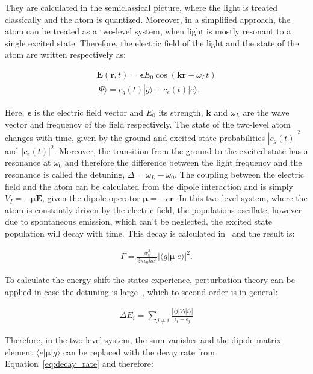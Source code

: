 They are calculated in the semiclassical picture, where the light is treated classically and the atom is quantized. Moreover, in a simplified approach, the atom can be treated as a two-level system, when light is mostly resonant to a single excited state. Therefore, the electric field of the light and the state of the atom are written respectively as:

\begin{align}
	\mathbf{E}(\mathbf{r}, t) = \bm{\epsilon} E_0 \cos{(\mathbf{k r} - \omega_L t)} \\
	|\Psi \rangle = c_g(t) |g\rangle + c_e(t)|e\rangle.
\end{align}

Here, $\bm{\epsilon}$ is the electric field vector and $E_0$ its strength, $\bm{k}$ and $\omega_L$ are the wave vector and frequency of the field respectively. The state of the two-level atom changes with time, given by the ground and excited state probabilities $|c_g(t)|^2$ and $|c_e(t)|^2$. Moreover, the transition from the ground to the excited state has a resonance at $\omega_0$ and therefore the difference between the light frequency and the resonance is called the detuning, $\Delta = \omega_L - \omega_0$. The coupling between the electric field and the atom can be calculated from the dipole interaction and is simply $V_I = -\bm{\mu} \bm{E}$, given the dipole operator $\bm{\mu} = -e \bm{r}$. In this two-level system, where the atom is constantly driven by the electric field, the populations oscillate, however due to spontaneous emission, which can't be neglected, the excited state population will decay with time. This decay is calculated in~\cite{King2008} and the result is:

\begin{align}
	\label{eq:decay_rate}
	\Gamma = \frac{w_0^3}{3 \pi \epsilon_0 \hbar c^3} |\langle g | \bm{\mu} | e \rangle|^2.
\end{align}

To calculate the energy shift the states experience, perturbation theory can be applied in case the detuning is large~\cite{Grimm2000}, which to second order is in general:

\begin{align}
	\Delta E_i = \sum_{j\neq i} \frac{|\langle j| V_I | i \rangle|}{\epsilon_i - \epsilon_j}
\end{align}

Therefore, in the two-level system, the sum vanishes and the dipole matrix element $\langle e | \bm{\mu} | g \rangle$ can be replaced with the decay rate from Equation~\ref{eq:decay_rate} and therefore:

